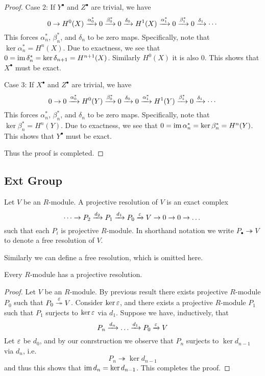 \begin{proof}
    Case 2: If $Y^\bullet$ and $Z^\bullet$ are trivial, we have
    \[0 \to H^0(X) \xrightarrow{\alpha^*_0} 0 \xrightarrow{\beta^*_0} 0 \xrightarrow{\delta_0} H^1(X) \xrightarrow{\alpha^*_1} 0 \xrightarrow{\beta^*_1} 0 \xrightarrow{\delta_1} \cdots\]
    This forces $\alpha_n^*$, $\beta_n^*$, and $\delta_n$ to be zero maps. Specifically, note that $\ker \alpha_n^* = H^n (X)$. Due to exactness, we see that $0 = \operatorname{im} \delta_n^* = \ker \delta_{n+1} = H^{n+1} (X)$. Similarly $H^0(X)$ it is also $0$. This shows that $X^\bullet$ must be exact.

    Case 3: If $X^\bullet$ and $Z^\bullet$ are trivial, we have
    \[0 \to 0 \xrightarrow{\alpha^*_0} H^0(Y) \xrightarrow{\beta^*_0} 0 \xrightarrow{\delta_0} 0 \xrightarrow{\alpha^*_1} H^1(Y) \xrightarrow{\beta^*_1} 0 \xrightarrow{\delta_1} \cdots\]
    This forces $\alpha_n^*$, $\beta_n^*$, and $\delta_n$ to be zero maps. Specifically, note that $\ker \beta_n^* = H^n (Y)$. Due to exactness, we see that $0 = \operatorname{im} \alpha_n^* = \ker \beta_{n}^* = H^{n} (Y)$. This shows that $Y^\bullet$ must be exact.

    Thus the proof is completed.
\end{proof}


\newpage
\subsection{Ext Group}

\begin{defn} 
    Let $V$ be an $R$-module. A projective resolution of $V$ is an exact complex 
    \[\cdots \to P_2 \xrightarrow{d_2} P_1 \xrightarrow{d_1} P_0 \xrightarrow{\varepsilon} V \to 0\to 0 \to \dots\]
    such that each $P_i$ is projective $R$-module. In shorthand notation we write $P_\bullet \twoheadrightarrow V$ to denote a free resolution of $V$.
\end{defn}
 
\medskip

\begin{re}
    Similarly we can define a free resolution, which is omitted here.
\end{re}

\medskip

\begin{pro}
    Every $R$-module has a projective resolution.
\end{pro}
\begin{proof}
    Let $V$ be an $R$-module. By previous result there exists projective $R$-module $P_0$ such that $P_0 \overset{\varepsilon}{\twoheadrightarrow} V$. Consider $\ker \varepsilon$, and there exists a projective $R$-module $P_1$ such that $P_1$ surjects to $\ker \varepsilon$ via $d_1$. Suppose we have, inductively, that 
    \[P_n \xrightarrow{d_n} \dots \xrightarrow{d_1} P_0 \xrightarrow{\varepsilon} V\]
    Let $\varepsilon$ be $d_0$, and by our conrstruction we observe that $P_n$ surjects to $\ker d_{n-1}$ via $d_n$, i.e.
    \[P_n \twoheadrightarrow \ker d_{n-1}\]
    and thus this shows that $\operatorname{im} d_{n} = \ker d_{n-1}$. This completes the proof.
\end{proof}

